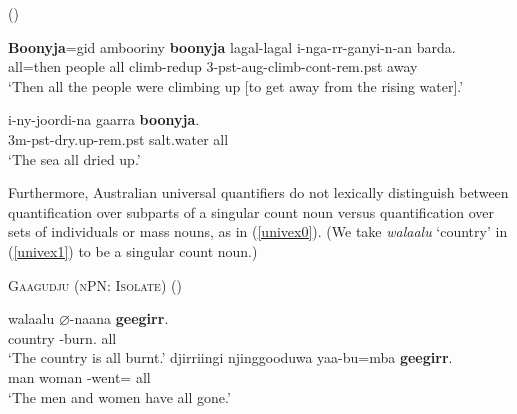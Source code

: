 \documentclass[12pt,egregdoesnotlikesansseriftitles]{scrartcl}
\begin{document}
\begin{exe}
 (\citealt{bowern12}) \label{univmasscount1}
\begin{xlist}
\ex %
\gll \textbf{Boonyja}=gid ambooriny \textbf{boonyja} lagal-lagal   i-nga-rr-ganyi-n-an barda.\\
all={\sc then} people all climb-{\sc redup}  3-{\sc pst-aug}-climb-{\sc cont-rem.pst} away\\
`Then all the people were climbing up [to get away from the rising water].'\label{univmasscount2}

\ex \gll i-ny-joordi-na gaarra \textbf{boonyja}.\\
3{\sc m-pst}-dry.up-{\sc rem.pst} salt.water all\\
`The sea all dried up.'\label{univmasscount3} %
\end{xlist}
\end{exe}


Furthermore,  Australian universal quantifiers do not lexically distinguish between quantification  over subparts of a singular count noun versus quantification over sets of individuals or mass nouns, as in (\ref{univex0}). (We take \textit{walaalu} `country' in (\ref{univex1}) to be a singular count noun.)


\begin{exe}
 \ex \textsc{Gaagudju (nPN: Isolate)} (\citealt[307]{harvey92}) \label{univex0}
  \begin{xlist}
      \ex \gll walaalu $\varnothing$-naana \textbf{geegirr}.\\
    country \Cliv-burn.\Pp{} all\\
    \glt `The country is all burnt.' \label{univex1}
    \ex \gll djirriingi njinggooduwa yaa-bu=mba \textbf{geegirr}.\\
    man woman \Third\Cli-went=\Aug{} all\\
    \glt `The men and women have all gone.' \label{univex2}
  \end{xlist}
\end{exe}
\end{document}
